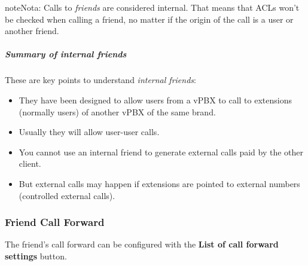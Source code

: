 \documentclass[letterpaper,10pt,spanish]{sphinxmanual}
\begin{document}
\begin{notice}{note}{Nota:}
Calls to \emph{friends} are considered internal. That means that ACLs won't
be checked when calling a friend, no matter if the origin of the call
is a user or another friend.
\end{notice}


\subparagraph{Summary of internal friends}
\label{administration_portal/client/vpbx/routing_endpoints/friends/internal_friends:summary-of-internal-friends}
These are key points to understand \emph{internal friends}:
\begin{itemize}
\item {} 
They have been designed to allow users from a vPBX to call to extensions (normally users)
of another vPBX of the same brand.

\item {} 
Usually they will allow user-user calls.

\item {} 
You cannot use an internal friend to generate external calls paid by the other client.

\item {} 
But external calls may happen if extensions are pointed to external numbers (controlled external calls).

\end{itemize}


\subsubsection{Friend Call Forward}
\label{administration_portal/client/vpbx/routing_endpoints/friends/index:friend-call-forward}
The friend's call forward can be configured with the \textbf{List of call forward settings}  button.
\end{document}
